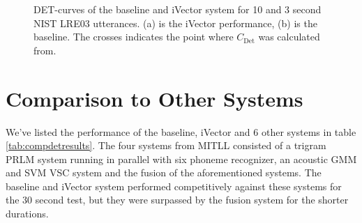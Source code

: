 \begin{figure}[hbt!]
	\begin{center}
	\end{center}
	\caption{DET-curves of the baseline and iVector system for 10 and 3 second NIST LRE03 utterances. (a) is the iVector performance, (b) is the baseline. The crosses indicates the point where $C_{\text{Det}}$ was calculated from.}
	\label{fig:sysdetshort}
\end{figure}
 
\section{Comparison to Other Systems}

We've listed the performance of the baseline, iVector and 6 other systems in table \ref{tab:compdetresults}. The four systems from MITLL consisted of a trigram PRLM system running in parallel with six phoneme recognizer, an acoustic GMM and SVM VSC system and the fusion of the aforementioned systems. The baseline and iVector system performed competitively against these systems for the 30 second test, but they were surpassed by the fusion system for the shorter durations. 

